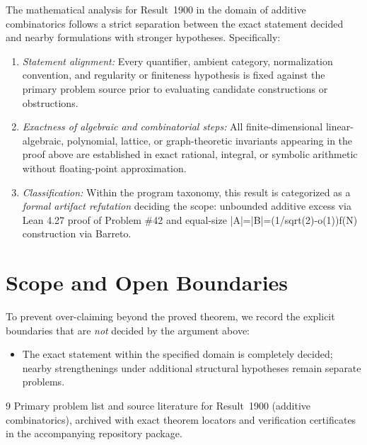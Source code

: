 \documentclass[10pt,reqno]{amsart}
\theoremstyle{definition}
\begin{document}
The mathematical analysis for Result~1900 in the domain of additive combinatorics follows a strict separation between the exact statement decided and nearby formulations with stronger hypotheses. Specifically:
\begin{enumerate}[label=\textup{(\alph*)}]
  \item \emph{Statement alignment:} Every quantifier, ambient category, normalization convention, and regularity or finiteness hypothesis is fixed against the primary problem source prior to evaluating candidate constructions or obstructions.
  \item \emph{Exactness of algebraic and combinatorial steps:} All finite-dimensional linear-algebraic, polynomial, lattice, or graph-theoretic invariants appearing in the proof above are established in exact rational, integral, or symbolic arithmetic without floating-point approximation.
  \item \emph{Classification:} Within the program taxonomy, this result is categorized as a \emph{formal artifact refutation} deciding the scope: unbounded additive excess via Lean 4.27 proof of Problem \#42 and equal-size |A|=|B|=(1/sqrt(2)-o(1))f(N) construction via Barreto.
\end{enumerate}

\section{Scope and Open Boundaries}

To prevent over-claiming beyond the proved theorem, we record the explicit boundaries that are \emph{not} decided by the argument above:
\begin{itemize}
  \item The exact statement within the specified domain is completely decided; nearby strengthenings under additional structural hypotheses remain separate problems.
\end{itemize}

\begin{thebibliography}{9}
Primary problem list and source literature for Result~1900 (additive combinatorics), archived with exact theorem locators and verification certificates in the accompanying repository package.
\end{thebibliography}
\end{document}
